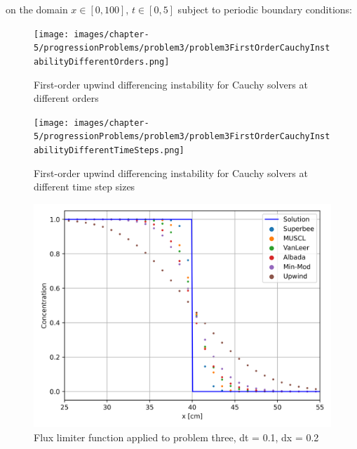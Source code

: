 \noindent on the domain $x \in [0, 100]$, $t \in [0, 5]$ subject to periodic boundary conditions:

\clearpage

\begin{figure}[p]
    \centering
    \texttt{[image: images/chapter-5/progressionProblems/problem3/problem3FirstOrderCauchyInstabilityDifferentOrders.png]}
    \caption{First-order upwind differencing instability for Cauchy solvers at different orders}
    \label{fig:first_order_results_cauchy_instability_different_orders}
\end{figure}

\clearpage

\begin{figure}[p]
    \centering
    \texttt{[image: images/chapter-5/progressionProblems/problem3/problem3FirstOrderCauchyInstabilityDifferentTimeSteps.png]}
    \caption{First-order upwind differencing instability for Cauchy solvers at different time step sizes}
    \label{fig:first_order_results_cauchy_instability_different_time_steps}
\end{figure}

\clearpage

\begin{figure}[p]
    \centering
    \includegraphics[width=5in]{images/chapter-5/progressionProblems/problem3/problem3FluxLimiters.png}
    \caption{Flux limiter function applied to problem three, dt = 0.1, dx = 0.2}
    \label{fig:fluxlimiters_problem3}
\end{figure}

\clearpage

